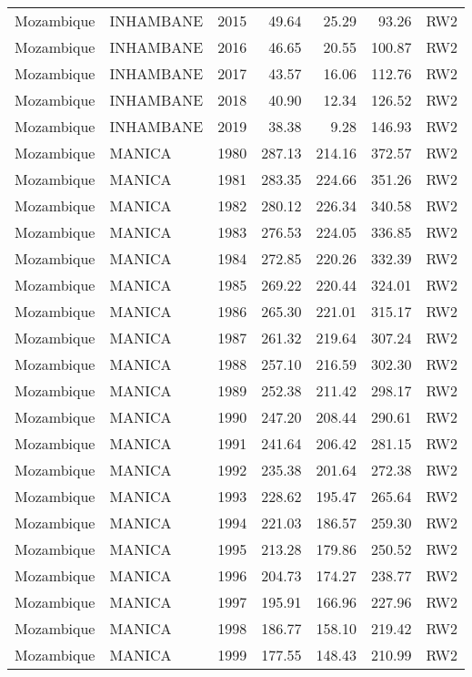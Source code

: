 \begin{longtable}{lllrrrl}
  Mozambique & INHAMBANE & 2015 & 49.64 & 25.29 & 93.26 & RW2 \\ 
  Mozambique & INHAMBANE & 2016 & 46.65 & 20.55 & 100.87 & RW2 \\ 
  Mozambique & INHAMBANE & 2017 & 43.57 & 16.06 & 112.76 & RW2 \\ 
  Mozambique & INHAMBANE & 2018 & 40.90 & 12.34 & 126.52 & RW2 \\ 
  Mozambique & INHAMBANE & 2019 & 38.38 & 9.28 & 146.93 & RW2 \\ 
  Mozambique & MANICA & 1980 & 287.13 & 214.16 & 372.57 & RW2 \\ 
  Mozambique & MANICA & 1981 & 283.35 & 224.66 & 351.26 & RW2 \\ 
  Mozambique & MANICA & 1982 & 280.12 & 226.34 & 340.58 & RW2 \\ 
  Mozambique & MANICA & 1983 & 276.53 & 224.05 & 336.85 & RW2 \\ 
  Mozambique & MANICA & 1984 & 272.85 & 220.26 & 332.39 & RW2 \\ 
  Mozambique & MANICA & 1985 & 269.22 & 220.44 & 324.01 & RW2 \\ 
  Mozambique & MANICA & 1986 & 265.30 & 221.01 & 315.17 & RW2 \\ 
  Mozambique & MANICA & 1987 & 261.32 & 219.64 & 307.24 & RW2 \\ 
  Mozambique & MANICA & 1988 & 257.10 & 216.59 & 302.30 & RW2 \\ 
  Mozambique & MANICA & 1989 & 252.38 & 211.42 & 298.17 & RW2 \\ 
  Mozambique & MANICA & 1990 & 247.20 & 208.44 & 290.61 & RW2 \\ 
  Mozambique & MANICA & 1991 & 241.64 & 206.42 & 281.15 & RW2 \\ 
  Mozambique & MANICA & 1992 & 235.38 & 201.64 & 272.38 & RW2 \\ 
  Mozambique & MANICA & 1993 & 228.62 & 195.47 & 265.64 & RW2 \\ 
  Mozambique & MANICA & 1994 & 221.03 & 186.57 & 259.30 & RW2 \\ 
  Mozambique & MANICA & 1995 & 213.28 & 179.86 & 250.52 & RW2 \\ 
  Mozambique & MANICA & 1996 & 204.73 & 174.27 & 238.77 & RW2 \\ 
  Mozambique & MANICA & 1997 & 195.91 & 166.96 & 227.96 & RW2 \\ 
  Mozambique & MANICA & 1998 & 186.77 & 158.10 & 219.42 & RW2 \\ 
  Mozambique & MANICA & 1999 & 177.55 & 148.43 & 210.99 & RW2 \\ 

\end{longtable}
